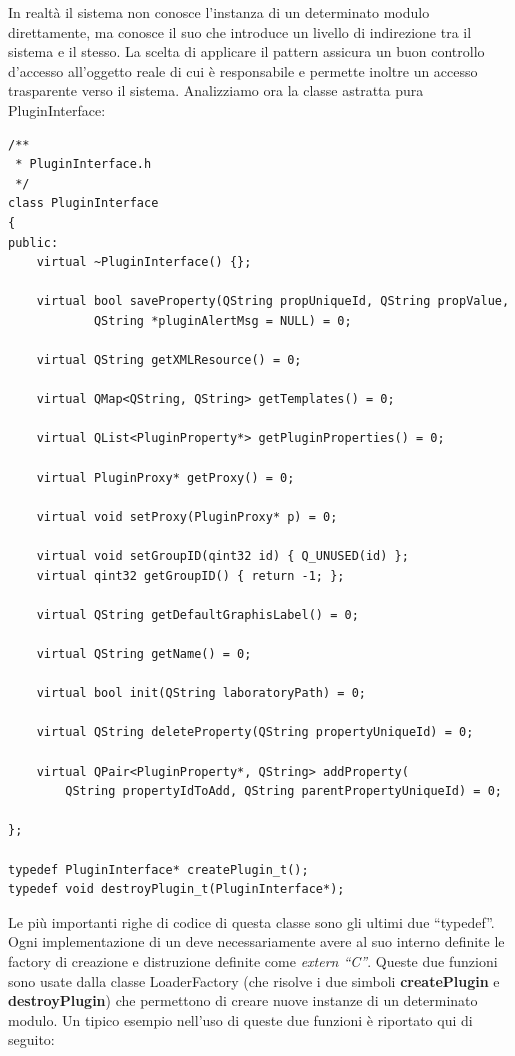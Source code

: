 In realtà il sistema non conosce l'instanza di un determinato modulo direttamente, ma conosce il suo \proxy{} che introduce un livello di indirezione tra il sistema e il \plugin{} stesso. La scelta di applicare il pattern \proxy{} assicura un buon controllo d'accesso all'oggetto reale di cui è responsabile e permette inoltre un accesso trasparente verso il sistema. Analizziamo ora la classe astratta pura PluginInterface:
\begin{lstlisting}
/**
 * PluginInterface.h
 */
class PluginInterface
{
public:
	virtual ~PluginInterface() {};

	virtual bool saveProperty(QString propUniqueId, QString propValue,
			QString *pluginAlertMsg = NULL) = 0;

	virtual QString getXMLResource() = 0;

	virtual QMap<QString, QString> getTemplates() = 0;
	
	virtual QList<PluginProperty*> getPluginProperties() = 0;

	virtual PluginProxy* getProxy() = 0;

	virtual void setProxy(PluginProxy* p) = 0;

	virtual void setGroupID(qint32 id) { Q_UNUSED(id) };
	virtual qint32 getGroupID() { return -1; };

	virtual QString getDefaultGraphisLabel() = 0;

	virtual QString getName() = 0;

	virtual bool init(QString laboratoryPath) = 0;
	
	virtual QString deleteProperty(QString propertyUniqueId) = 0;
	
	virtual QPair<PluginProperty*, QString> addProperty(
		QString propertyIdToAdd, QString parentPropertyUniqueId) = 0;
	
};

typedef PluginInterface* createPlugin_t();
typedef void destroyPlugin_t(PluginInterface*);
\end{lstlisting}

Le più importanti righe di codice di questa classe sono gli ultimi due ``typedef''. Ogni implementazione di un \plugin{} deve necessariamente avere al suo interno definite le factory di creazione e distruzione definite come \emph{extern ``C''}. Queste due funzioni sono usate dalla classe LoaderFactory (che risolve i due simboli \textbf{createPlugin} e \textbf{destroyPlugin}) che permettono di creare nuove instanze di un determinato modulo. Un tipico esempio nell'uso di queste due funzioni è riportato qui di seguito:

